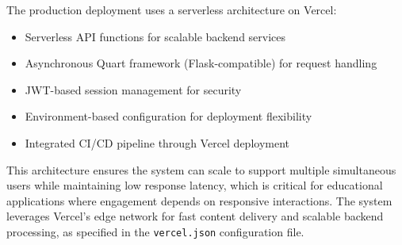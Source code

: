 The production deployment uses a serverless architecture on Vercel:

\begin{itemize}
  \item Serverless API functions for scalable backend services
  \item Asynchronous Quart framework (Flask-compatible) for request handling
  \item JWT-based session management for security
  \item Environment-based configuration for deployment flexibility
  \item Integrated CI/CD pipeline through Vercel deployment
\end{itemize}

This architecture ensures the system can scale to support multiple simultaneous users while maintaining low response latency, which is critical for educational applications where engagement depends on responsive interactions. The system leverages Vercel's edge network for fast content delivery and scalable backend processing, as specified in the \texttt{vercel.json} configuration file.